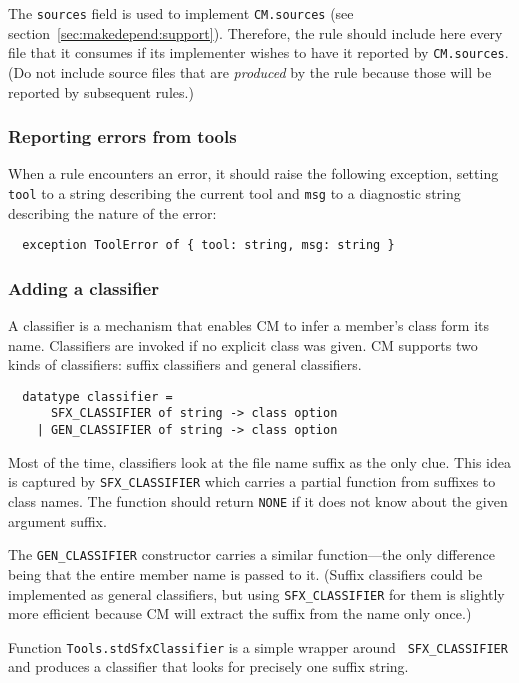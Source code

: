 The {\tt sources} field is used to implement {\tt CM.sources} (see
section~\ref{sec:makedepend:support}).  Therefore, the rule should
include here every file that it consumes if its implementer wishes to
have it reported by {\tt CM.sources}.  (Do not include source files
that are {\em produced} by the rule because those will be reported by
subsequent rules.)

\subsubsection{Reporting errors from tools}

When a rule encounters an error, it should raise the following
exception, setting {\tt tool} to a string describing the current tool
and {\tt msg} to a diagnostic string describing the nature of the
error:

\begin{verbatim}
  exception ToolError of { tool: string, msg: string }
\end{verbatim}

\subsubsection{Adding a classifier}

A classifier is a mechanism that enables CM to infer a member's class
form its name.  Classifiers are invoked if no explicit class was
given.  CM supports two kinds of classifiers: suffix classifiers and
general classifiers.

\begin{verbatim}
  datatype classifier =
      SFX_CLASSIFIER of string -> class option
    | GEN_CLASSIFIER of string -> class option
\end{verbatim}

Most of the time, classifiers look at the file name suffix as the only
clue.  This idea is captured by {\tt SFX\_CLASSIFIER} which carries a
partial function from suffixes to class names.  The function should
return {\tt NONE} if it does not know about the given argument suffix.

The {\tt GEN\_CLASSIFIER} constructor carries a similar function---the
only difference being that the entire member name is passed to it.
(Suffix classifiers could be implemented as general classifiers, but
using {\tt SFX\_CLASSIFIER} for them is slightly more efficient
because CM will extract the suffix from the name only once.)

Function {\tt Tools.stdSfxClassifier} is a simple wrapper around {\tt
SFX\_CLASSIFIER} and produces a classifier that looks for precisely
one suffix string.

